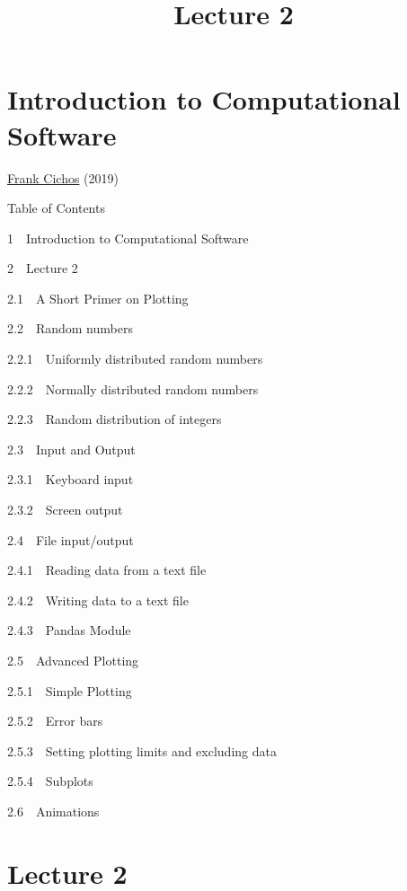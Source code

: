 \documentclass[11pt]{article}
\title{Lecture 2}
\begin{document}
    
    
    \maketitle
    
    

    
    \hypertarget{introduction-to-computational-software}{%
\section{Introduction to Computational
Software}\label{introduction-to-computational-software}}

\href{cichos@physik.uni-leipzig.de}{Frank Cichos} (2019)

    

    Table of Contents{}

{{1~~}Introduction to Computational Software}

{{2~~}Lecture 2}

{{2.1~~}A Short Primer on Plotting}

{{2.2~~}Random numbers}

{{2.2.1~~}Uniformly distributed random numbers}

{{2.2.2~~}Normally distributed random numbers}

{{2.2.3~~}Random distribution of integers}

{{2.3~~}Input and Output}

{{2.3.1~~}Keyboard input}

{{2.3.2~~}Screen output}

{{2.4~~}File input/output}

{{2.4.1~~}Reading data from a text file}

{{2.4.2~~}Writing data to a text file}

{{2.4.3~~}Pandas Module}

{{2.5~~}Advanced Plotting}

{{2.5.1~~}Simple Plotting}

{{2.5.2~~}Error bars}

{{2.5.3~~}Setting plotting limits and excluding data}

{{2.5.4~~}Subplots}

{{2.6~~}Animations}

    \hypertarget{lecture-2}{%
\section{Lecture 2}\label{lecture-2}}
\end{document}
